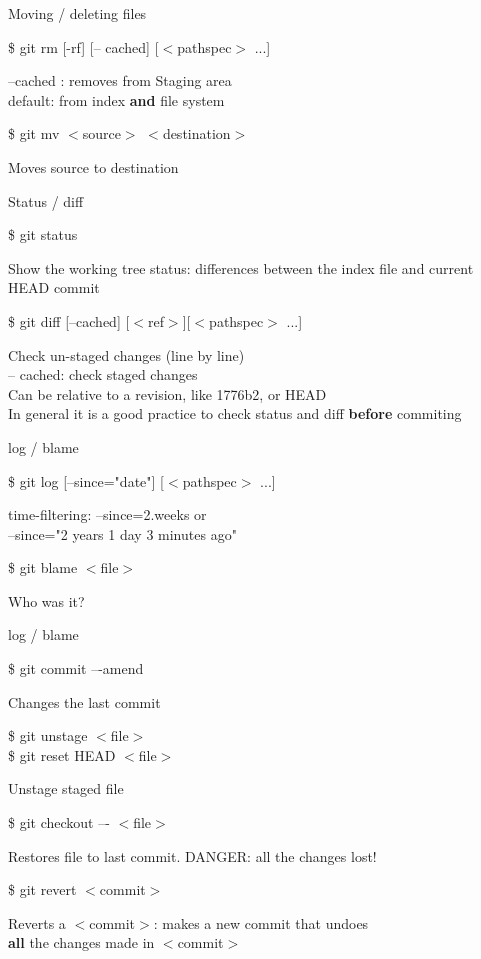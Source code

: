 \documentclass[10pt,xcolor=dvipsnames]{beamer}
\begin{document}
\begin{frame}{Moving / deleting files}
\begin{block}{}
\$ git rm [-rf] [-- cached] [$<$pathspec$>$ ...]
\end{block}
--cached : removes from Staging area\\
default: from index {\bf and} file system\\[0.4in]
\begin{block}{}
\$ git mv $<$source$>$ $<$destination$>$
\end{block}
Moves source to destination
\end{frame}

\begin{frame}{Status / diff }
\begin{block}{}
\$ git status 
\end{block}
Show the working tree status: differences between the index file and current HEAD commit\\[0.4in]
\begin{block}{}
\$ git diff [--cached] [$<$ref$>$][$<$pathspec$>$ ...]
\end{block}
Check un-staged changes (line by line)\\
-- cached: check staged changes\\
Can be relative to a revision, like 1776b2, or HEAD\\[0.4in]

In general it is a good practice to check status and diff {\bf before} commiting
\end{frame}

\begin{frame}{log / blame }
\begin{block}{}
\$ git log [--since="date"] [$<$pathspec$>$ ...]
\end{block}
time-filtering: --since=2.weeks or\\
--since="2 years 1 day 3 minutes ago"\\[0.4in]

\begin{block}{}
\$ git blame $<$file$>$ 
\end{block}
Who was it?
\end{frame}


\begin{frame}{log / blame }
\begin{block}{}
\$ git commit –-amend
\end{block}
Changes the last commit
\begin{block}{}
\$ git unstage $<$file$>$ \\
\$ git reset HEAD $<$file$>$
\end{block}
Unstage staged file
\begin{block}{}
\$ git checkout –- $<$file$>$
\end{block}
Restores file to last commit. DANGER: all the changes lost!
\begin{block}{}
\$ git revert $<$commit$>$
\end{block}
Reverts a $<$commit$>$: makes a new commit that undoes \\ {\bf all} the changes made in $<$commit$>$
\end{frame}
\end{document}
